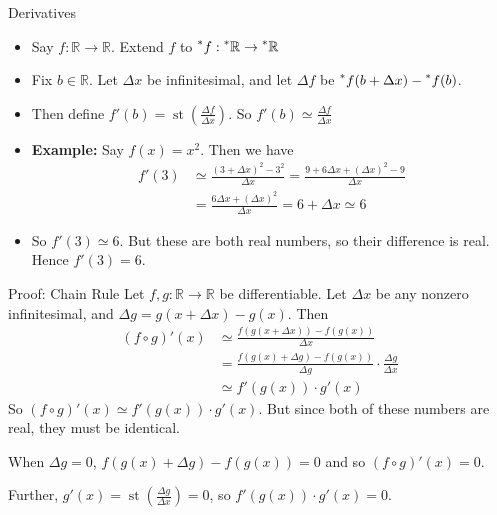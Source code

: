 \documentclass{beamer}
\theoremstyle{plain}
\theoremstyle{definition}
\newcommand{\stp}[1]{\st\left(#1\right)}
\newcommand{\reals}{\mathbb{R}}
\newcommand{\hreals}{\prescript{*}{}{\mathbb{R}}}
\newcommand{\hr}[1]{\prescript{*}{}{#1}}
\DeclareMathOperator{\st}{st}
\begin{document}
\begin{frame}{Derivatives}
\begin{itemize}
\item Say $f: \reals \to \reals$. Extend $f$ to $\hr{f}: \hreals \to \hreals$
\item Fix $b \in \reals$. Let $\Delta x$ be infinitesimal, and let $\Delta f$ be $\hr{f}(b + \Delta x) - \hr{f}(b)$.
\item Then define $f'(b) = \stp{\frac{\Delta f}{\Delta x}}$. So $f'(b) \simeq \frac{\Delta f}{\Delta x}$
\item \textbf{Example:} Say $f(x) = x^2$. Then we have 
\begin{align*}
f'(3) &\simeq \frac{(3 + \Delta x)^2 - 3^2}{\Delta x} = \frac{9 + 6 \Delta x + (\Delta x)^2 - 9}{\Delta x} \\
	&= \frac{6 \Delta x + (\Delta x)^2}{\Delta x} = 6 + \Delta x \simeq 6
\end{align*}
\item So $f'(3) \simeq 6$. But these are both real numbers, so their difference is real. Hence $f'(3) = 6$.
\end{itemize}
\end{frame}

\begin{frame}{Proof: Chain Rule}
Let $f,g: \reals \to \reals$ be differentiable. Let $\Delta x$ be any nonzero infinitesimal, and $\Delta g = g(x + \Delta x) - g(x)$. Then
\begin{align*}
(f \circ g)'(x) &\simeq \frac{f(g(x + \Delta x)) - f(g(x))}{\Delta x}  \\
	&= \frac{f(g(x) + \Delta g) - f(g(x))}{\Delta g} \cdot \frac{\Delta g}{\Delta x} \\ 
	&\simeq f'(g(x))\cdot g'(x)
\end{align*}
So $(f \circ g)'(x) \simeq f'(g(x)) \cdot g'(x)$. But since both of these numbers are real, they must be identical.
\vspace{2mm}

When $\Delta g = 0$, $f(g(x) + \Delta g) - f(g(x)) = 0$ and so $(f \circ g)'(x) = 0$. 
\vspace{1mm}

Further, $g'(x) = \stp{\frac{\Delta g}{\Delta x}} = 0$, so $f'(g(x)) \cdot g'(x) = 0$.
\end{frame}
\end{document}
